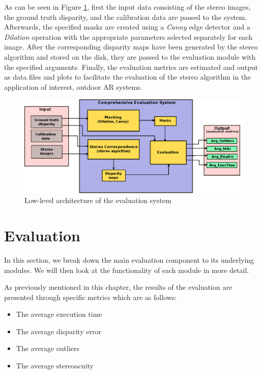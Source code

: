 As can be seen in Figure \ref{fig:lowarch}, first the input data consisting of the stereo images, the ground truth disparity, and 
the calibration data are passed to the system.
Afterwards, the specified masks are created using a \textit{Canny} edge detector and a \textit{Dilation} operation with the appropriate parameters 
selected separately for each image.
After the corresponding disparity maps have been generated by the stereo algorithm and stored on the disk, 
they are passed to the evaluation module with the specified arguments.
Finally, the evaluation metrics are estimated and output as data files and plots to facilitate the evaluation of the stereo algorithm in the application
of interest, outdoor AR systems.

\begin{figure}[H]
\centering
\includegraphics{EvalSyslow}
\caption{Low-level architecture of the evaluation system}
\label{fig:lowarch}
\end{figure} 

\section{Evaluation}
In this section, we break down the main evaluation component to its underlying modules. We will then look at the functionality of each
module in more detail.

As previously mentioned in this chapter, the results of the evaluation are presented through specific metrics which are as follows:

\begin{itemize}
\item{The average execution time}
\item{The average disparity error}
\item{The average outliers}
\item{The average stereoacuity}
\end{itemize}

